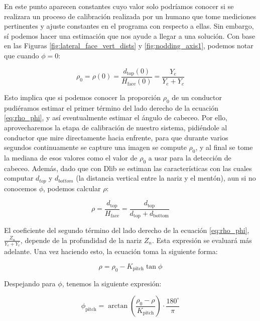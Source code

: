 En este punto aparecen constantes cuyo valor solo podríamos conocer si se realizara un proceso de calibración realizada por un humano que tome mediciones pertinentes y ajuste constantes en el programa con respecto a ellas. Sin embargo, sí podemos hacer una estimación que nos ayude a llegar a una solución. Con base en las Figuras \ref{fig:lateral_face_vert_dists} y \ref{fig:nodding_axis1}, podemos notar que cuando $\phi=0$:

\begin{equation}
\rho_0 = \rho(0) = \frac{d_{\mathrm{top}}(0)}{H_{\mathrm{face}}(0)}
= \frac{Y_e}{Y_e + Y_c}
\label{eq:rho_0_phi_0}
\end{equation}

Esto implica que si podemos conocer la proporción $\rho_0$ de un conductor pudiéramos estimar el primer término del lado derecho de la ecuación \ref{eq:rho_phi}, y así eventualmente estimar el ángulo de cabeceo. Por ello, aprovecharemos la etapa de calibración de nuestro sistema, pidiéndole al conductor que mire directamente hacia enfrente, para que durante varios segundos continuamente se capture una imagen se compute $\rho_0$, y al final se tome la mediana de esos valores como el valor de $\rho_0$ a usar para la detección de cabeceo. Además, dado que con Dlib se estiman las características con las cuales computar $d_{top}$ y $d_{bottom}$ (la distancia vertical entre la nariz y el mentón), aun si no conocemos $\phi$, podemos calcular $\rho$:

\begin{equation}
\rho = \frac{d_{\mathrm{top}}}{H_{\mathrm{face}}} = \frac{d_{\mathrm{top}}}{d_{\mathrm{top}} + d_{\mathrm{bottom}}}
\label{eq:rho}
\end{equation}

El coeficiente del segundo término del lado derecho de la ecuación \ref{eq:rho_phi}, $\frac{Z_n}{Y_e + Y_c}$, depende de la profundidad de la nariz $Z_n$. Esta expresión se evaluará más adelante. Una vez haciendo esto, la ecuación toma la siguiente forma: 

\begin{equation}
\rho = \rho_0 - K_{\mathrm{pitch}}\tan\phi
\label{eq:rho_simple}
\end{equation}

Despejando para $\phi$, tenemos la siguiente expresión:

\begin{equation}
\phi_{\mathrm{pitch}} = \arctan\!\left(\frac{\rho_0 - \rho}{K_{\mathrm{pitch}}}\right) \cdot \frac{180^\circ}{\pi}
\label{eq:theta_deg}
\end{equation}

